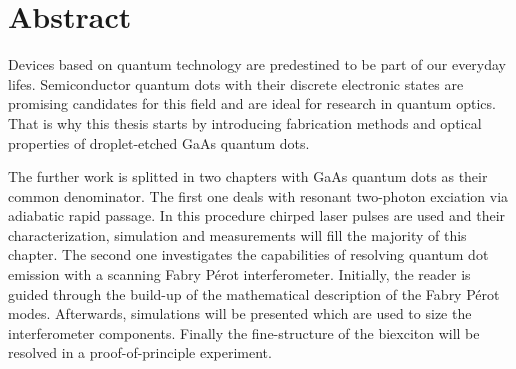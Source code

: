 

\chapter*{Abstract}
\label{cha:abstract}


Devices based on quantum technology are predestined to be part of our everyday lifes.
Semiconductor quantum dots with their discrete electronic states are promising candidates for this field and are ideal for research in quantum optics.
That is why this thesis starts by introducing fabrication methods and optical properties of droplet-etched GaAs quantum dots. 

The further work is splitted in two chapters with GaAs quantum dots as their common denominator.
The first one deals with resonant two-photon exciation via adiabatic rapid passage.
In this procedure chirped laser pulses are used and their characterization, simulation and measurements will fill the majority of this chapter.
The second one investigates the capabilities of resolving quantum dot emission with a scanning Fabry Pérot interferometer.
Initially, the reader is guided through the build-up of the mathematical description of the Fabry Pérot modes.
Afterwards, simulations will be presented which are used to size the interferometer components.
Finally the fine-structure of the biexciton will be resolved in a proof-of-principle experiment. 

